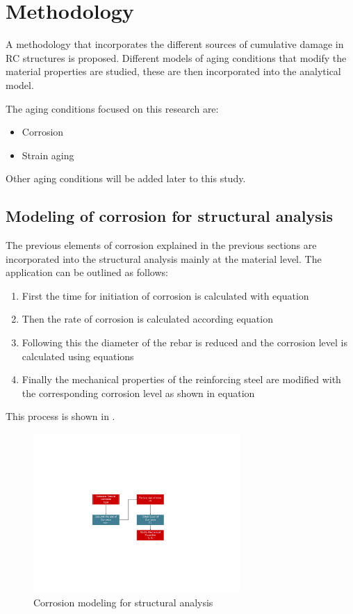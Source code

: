 \chapter{Methodology}
\label{chap-four}
A methodology that incorporates the different sources of cumulative damage in RC structures is proposed. Different models of aging conditions that modify the material properties are studied, these are then incorporated into the analytical model.

The aging conditions focused on this research are:
\begin{itemize}
	\item Corrosion
	\item Strain aging
\end{itemize}

Other aging conditions will be added later to this study.

\section{Modeling of corrosion for structural analysis}

The previous elements of corrosion explained in the previous sections are incorporated into the structural analysis mainly at the material level. The application can be outlined as follows:
\begin{enumerate}
	\item First the time for initiation of corrosion is calculated with equation  
	\item Then the rate of corrosion is calculated according equation 
	\item Following this the diameter of the rebar is reduced and the corrosion level is calculated using equations   
	\item Finally the mechanical properties of the reinforcing steel are modified with the corresponding corrosion level as shown in equation 
\end{enumerate}

This process is shown in .

\begin{figure}[htbp]
	\centering
	\includegraphics[width=0.7\textwidth]{Chapter-4/figs/Corrosion_Modeling}
	\caption{Corrosion modeling for structural analysis}
	\label{fig:CorrModel}
\end{figure}

